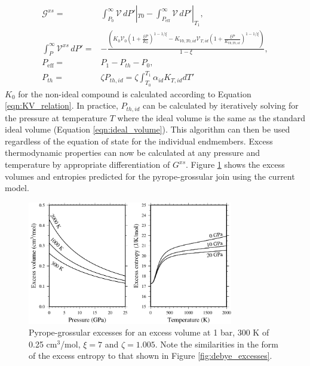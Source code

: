 \begin{eqnarray}
\mathcal{G}^{xs} =& \int_{P_0}^\infty \mathcal{V} \, dP' |_{T0} - \int_{P_\textrm{eff}}^\infty \mathcal{V} \, dP' |_{T_1} ,\\
\int_{P}^\infty \mathcal{V}^{xs} \, dP' =& - \frac{\left(K_0 \mathcal{V}_0 \left(1 + \frac{\xi P}{K_0}\right)^{1-1/\xi} - K_{V0, T0, id} \mathcal{V}_{T, id} \left(1 + \frac{\xi P}{K_{V0, T0, id}}\right)^{1-1/\xi} \right) }{1 - \xi} ,\\
P_{\textrm{eff}} =& P_1 - P_{th} - P_0, \\
P_{th} =& \zeta P_{th, id} = \zeta \int_{T_0}^{T_1} \alpha_{id} K_{T, id} dT' 
\end{eqnarray}
\noindent $K_0$ for the non-ideal compound is calculated according to Equation \ref{eqn:KV_relation}. In practice, $P_{th, id}$ can be calculated by iteratively solving for the pressure at temperature $T$ where the ideal volume is the same as the standard ideal volume (Equation \ref{eqn:ideal_volume}). This algorithm can then be used regardless of the equation of state for the individual endmembers. Excess thermodynamic properties can now be calculated at any pressure and temperature by appropriate differentiation of $G^{xs}$. Figure \ref{fig:xs_model} shows the excess volumes and entropies predicted for the pyrope-grossular join using the current model.
\begin{figure}[ht!]
  \centering
  \includegraphics[width=0.8\textwidth]{figures/VSxs_pygr}
  \caption{Pyrope-grossular excesses for an excess volume at 1 bar, 300 K of 0.25 cm$^3$/mol, $\xi=7$ and $\zeta=1.005$. Note the similarities in the form of the excess entropy to that shown in Figure \ref{fig:debye_excesses}.}
  \label{fig:xs_model}
\end{figure}


